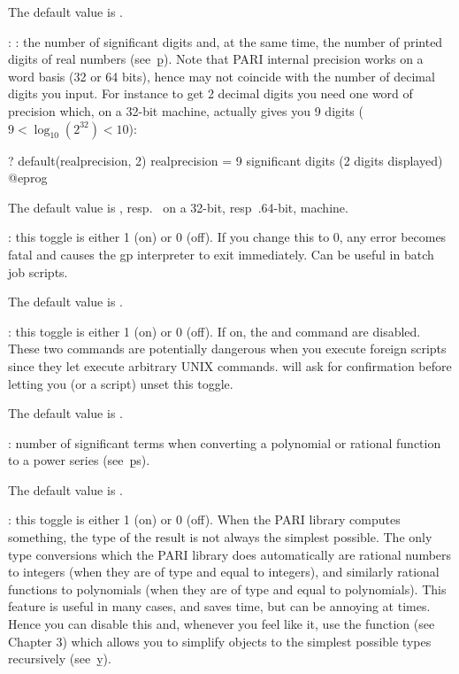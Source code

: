 The default value is .

: \label{se:def,realprecision}
 : the number of significant digits and, at the same
time, the number of printed digits of real numbers (see~\b{p}). Note that
PARI internal precision works on a word basis (32 or 64 bits), hence may not
coincide with the number of decimal digits you input. For instance to get 2
decimal digits you need one word of precision which, on a 32-bit machine,
actually gives you 9 digits ($9 < \log_{10}(2^{32}) < 10$):

\bprog
? default(realprecision, 2)
      realprecision = 9 significant digits (2 digits displayed)
@eprog

The default value is , resp.~ on a 32-bit, resp~.64-bit,
machine.

: \label{se:def,recover}this toggle is either 1 (on) or 0 (off). If you change this to $0$, any
error becomes fatal and causes the gp interpreter to exit immediately. Can be
useful in batch job scripts.

The default value is .

: \label{se:def,secure}this toggle is either 1 (on) or 0 (off). If on, the  and
 command are disabled. These two commands are potentially
dangerous when you execute foreign scripts since they let  execute
arbitrary UNIX commands.  will ask for confirmation before letting
you (or a script) unset this toggle.

The default value is .

: \label{se:def,seriesprecision}number of significant terms
when converting a polynomial or rational function to a power series
(see~\b{ps}).

The default value is .

: \label{se:def,simplify}this toggle is either 1 (on) or 0 (off). When the PARI library computes
something, the type of the
result is not always the simplest possible. The only type conversions which
the PARI library does automatically are rational numbers to integers (when
they are of type  and equal to integers), and similarly rational
functions to polynomials (when they are of type  and equal to
polynomials). This feature is useful in many cases, and saves time, but can
be annoying at times. Hence you can disable this and, whenever you feel like
it, use the function  (see Chapter 3) which allows you to
simplify objects to the simplest possible types recursively (see~\b{y}).

